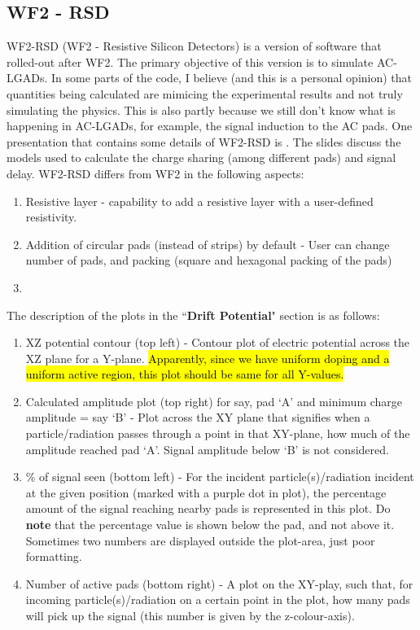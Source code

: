\documentclass[11pt]{article}
\newcommand{\hlyellow}[1]{{\sethlcolor{yellow}\hl{#1}}}
\begin{document}
\subsection{WF2 - RSD}
WF2-RSD (WF2 - Resistive Silicon Detectors) is a version of software that rolled-out after WF2. The primary objective of this version is to simulate AC-LGADs. In some parts of the code, I believe (and this is a personal opinion) that quantities being calculated are mimicing the experimental results and not truly simulating the physics. This is also partly because we still don't know what is happening in AC-LGADs, for example, the signal induction to the AC pads.
\newline
One presentation that contains some details of WF2-RSD is \cite{wf2-rsd-working-principles}. The slides discuss the models used to calculate the charge sharing (among different pads) and signal delay.
\newline
WF2-RSD differs from WF2 in the following aspects:
\begin{enumerate}
    \item Resistive layer - capability to add a resistive layer with a user-defined resistivity.
    \item Addition of circular pads (instead of strips) by default - User can change number of pads, and packing (square and hexagonal packing of the pads)
    \item 
\end{enumerate}
The description of the plots in the ``\textbf{Drift Potential}" section is as follows:
\begin{enumerate}
    \item XZ potential contour (top left) - Contour plot of electric potential across the XZ plane for a Y-plane. \hlyellow{Apparently, since we have uniform doping and a uniform active region, this plot should be same for all Y-values.}
    \item Calculated amplitude plot (top right) for say, pad `A' and minimum charge amplitude = say `B' - Plot across the XY plane that signifies when a particle/radiation passes through a point in that XY-plane, how much of the amplitude reached pad `A'. Signal amplitude below `B' is not considered.
    \item \% of signal seen (bottom left) - For the incident particle(s)/radiation incident at the given position (marked with a purple dot in plot), the percentage amount of the signal reaching nearby pads is represented in this plot. Do \textbf{note} that the percentage value is shown below the pad, and not above it. Sometimes two numbers are displayed outside the plot-area, just poor formatting.
    \item Number of active pads (bottom right) - A plot on the XY-play, such that, for incoming particle(s)/radiation on a certain point in the plot, how many pads will pick up the signal (this number is given by the z-colour-axis).
\end{enumerate}
\end{document}
